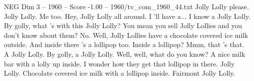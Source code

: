 \begin{textsample}{NEG Dim 3 – 1960 – Score -1.00 – 1960/tv\_com\_1960\_44.txt}  \label{ex:f3_neg_078}
Jolly Lolly please.
Jolly Lolly.
Me too.
Hey, Jolly Lolly all around.
I 'll have a...
I know a Jolly Lolly.
By golly, what 's with this Jolly Lolly?
You mean you sell Jolly Lollies and you don't know about them?
No.
Well, Jolly Lollies have a chocolate covered ice milk outside.
And inside there 's a lollipop too.
Inside a lollipop?
Mmm, that 's that.
A Jolly Lolly.
By golly, a Jolly Lolly.
Well, well, what do you know?
A nice milk bar with a lolly up inside.
I wonder how they get that lollipop in there.
Jolly Lolly.
Chocolate covered ice milk with a lollipop inside.
Fairmont Jolly Lolly.

\end{textsample}
